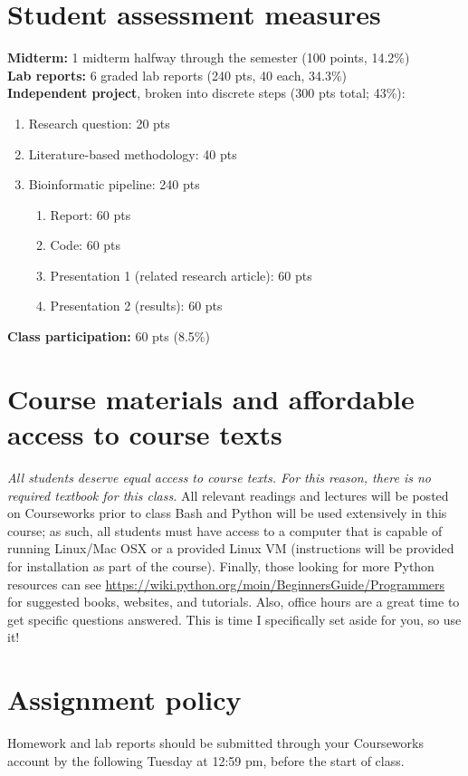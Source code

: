 \documentclass{article}
\begin{document}
\section*{Student assessment measures}
\textbf{Midterm:} 1 midterm halfway through the semester (100 points, 14.2\%)\\
\textbf{Lab reports:} 6 graded lab reports (240 pts, 40 each, 34.3\%)\\
\textbf{Independent project}, broken into discrete steps (300 pts total; 43\%):
\begin{enumerate}
    \item Research question: 20 pts
    \item Literature-based methodology: 40 pts
    \item Bioinformatic pipeline: 240 pts 
    \begin{enumerate}
        \item Report: 60 pts 
        \item Code: 60 pts 
        \item Presentation 1 (related research article): 60 pts
        \item Presentation 2 (results): 60 pts
    \end{enumerate}
\end{enumerate}
\textbf{Class participation:} 60 pts (8.5\%)

\section*{Course materials and affordable access to course texts}
\emph{All students deserve equal access to course texts. For this reason, there is no required textbook for this class.} All relevant readings and lectures will be posted on Courseworks prior to class Bash and Python will be used extensively in this course; as such, all students must have access to a computer that is capable of running Linux/Mac OSX or a provided Linux VM (instructions will be provided for installation as part of the course). Finally, those looking for more Python resources can see \url{https://wiki.python.org/moin/BeginnersGuide/Programmers} for suggested books, websites, and tutorials. Also, office hours are a great time to get specific questions answered. This is time I specifically set aside for you, so use it!

\section*{Assignment policy}
Homework and lab reports should be submitted through your Courseworks account by the following Tuesday at 12:59 pm, before the start of class. 
\end{document}
